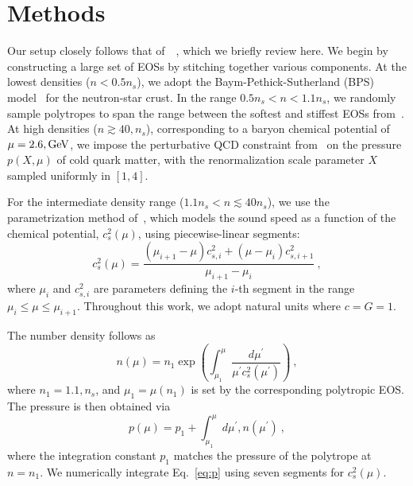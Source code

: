 \documentclass[twocolumn]{aastex631}
\begin{document}
	
	\section{Methods} \label{sec:Methods}
	
	
	Our setup closely follows that of~~\citet{Altiparmak:2022}, which we briefly review here. 
	We begin by constructing a large set of EOSs by stitching together various components.
	At the lowest densities ($n<0.5 n_s$), we adopt the Baym-Pethick-Sutherland (BPS) model~\citep{Baym71} for the neutron-star crust.
	In the range $0.5 n_s < n < 1.1 n_s$, we randomly sample polytropes to span the range between the softest and stiffest EOSs from~\citet{Hebeler:2013nza}.
	At high densities ($n \gtrsim 40,n_s$), corresponding to a baryon chemical potential of $\mu = 2.6,{\rm GeV}$, we impose the perturbative QCD constraint from~\citet{Fraga2014} on the pressure $p(X, \mu)$ of cold quark matter, with the renormalization scale parameter $X$ sampled uniformly in $[1,4]$.
	
	For the intermediate density range ($1.1 n_s < n \lesssim 40 n_s$), we use the parametrization method of~\citet{Annala2019}, which models the sound speed as a function of the chemical potential, $c_s^2(\mu)$, using piecewise-linear segments:
	\begin{equation} \label{eq:cs2}
		c_s^2(\mu) = \frac{\left(\mu_{i+1}-\mu \right) c_{s,i}^2 + \left(\mu - \mu_i \right) c_{s,i+1}^2}{\mu_{i+1}-\mu_i}~, 
	\end{equation}
	where $\mu_i$ and $c_{s,i}^2$ are parameters defining the $i$-th segment in the range $\mu_i \leq \mu \leq \mu_{i+1}$.
	Throughout this work, we adopt natural units where $c=G=1$.
	
	The number density follows as 
	\begin{equation} \label{eq:n}
		n(\mu) = n_1 \exp \left({\int_{\mu_1}^\mu \frac{d\mu^\prime}{\mu^\prime c_s^2(\mu^\prime)}}\right)~, 
	\end{equation} where $n_1 = 1.1,n_s$, and $\mu_1 = \mu(n_1)$ is set by the corresponding polytropic EOS.
	The pressure is then obtained via
	\begin{equation} \label{eq:p}
		p(\mu) = p_1 + \int_{\mu_1}^\mu d\mu^\prime , n(\mu^\prime)~,
	\end{equation}
	where the integration constant $p_1$ matches the pressure of the polytrope at $n = n_1$.
	We numerically integrate Eq.~\eqref{eq:p} using seven segments for $c_s^2(\mu)$.
	
\end{document}
